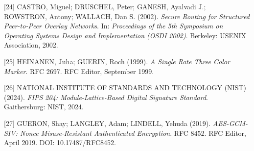 \documentclass[12pt]{article}
\begin{document}
[24] CASTRO, Miguel; DRUSCHEL, Peter; GANESH, Ayalvadi J.; ROWSTRON, Antony; WALLACH, Dan S. (2002).
\textit{Secure Routing for Structured Peer-to-Peer Overlay Networks}.
In: \textit{Proceedings of the 5th Symposium on Operating Systems Design and Implementation (OSDI 2002)}.
Berkeley: USENIX Association, 2002.

[25] HEINANEN, Juha; GUERIN, Roch (1999).
\textit{A Single Rate Three Color Marker}.
RFC 2697. RFC Editor, September 1999.

[26] NATIONAL INSTITUTE OF STANDARDS AND TECHNOLOGY (NIST) (2024).
\textit{FIPS 204: Module-Lattice-Based Digital Signature Standard}. Gaithersburg: NIST, 2024.


[27] GUERON, Shay; LANGLEY, Adam; LINDELL, Yehuda (2019).
\textit{AES-GCM-SIV: Nonce Misuse-Resistant Authenticated Encryption}.
RFC 8452. RFC Editor, April 2019.
DOI: 10.17487/RFC8452.

\endgroup
\end{document}
